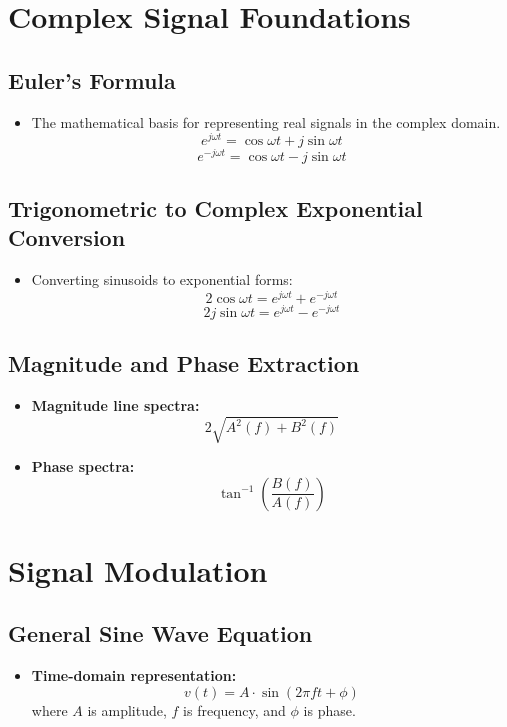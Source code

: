 \documentclass{article}
\begin{document}
\newpage
\section{Complex Signal Foundations}

\subsection*{Euler's Formula}
\begin{itemize}
    \item The mathematical basis for representing real signals in the complex domain.
    \[
    e^{j\omega t} = \cos \omega t + j \sin \omega t
    \]
    \[
    e^{-j\omega t} = \cos \omega t - j \sin \omega t
    \]
\end{itemize}

\subsection*{Trigonometric to Complex Exponential Conversion}
\begin{itemize}
    \item Converting sinusoids to exponential forms:
    \[
    2 \cos \omega t = e^{j\omega t} + e^{-j\omega t}
    \]
    \[
    2j \sin \omega t = e^{j\omega t} - e^{-j\omega t}
    \]
\end{itemize}

\subsection*{Magnitude and Phase Extraction}
\begin{itemize}
    \item \textbf{Magnitude line spectra:} 
    \[
    2\sqrt{A^2(f) + B^2(f)}
    \]
    \item \textbf{Phase spectra:} 
    \[
    \tan^{-1}\left(\frac{B(f)}{A(f)}\right)
    \]
\end{itemize}

\newpage
\section{Signal Modulation}

\subsection*{General Sine Wave Equation}
\begin{itemize}
    \item \textbf{Time-domain representation:}
    \[
    v(t) = A \cdot \sin(2\pi ft + \phi)
    \]
    where $A$ is amplitude, $f$ is frequency, and $\phi$ is phase.
\end{itemize}
\end{document}
